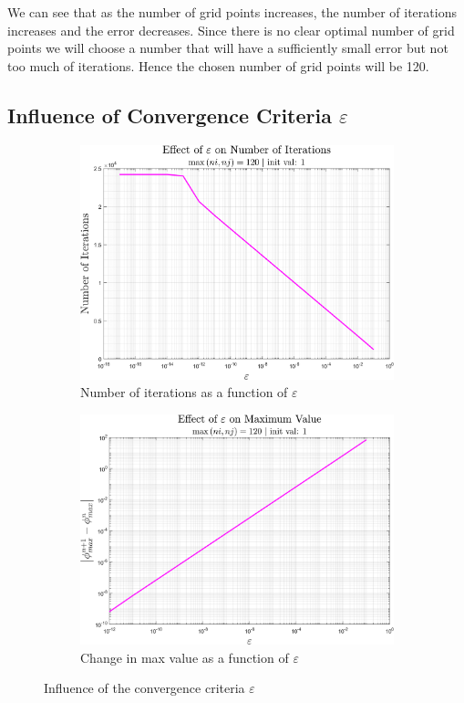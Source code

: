 \documentclass[11pt, a4paper]{article}
\begin{document}
We can see that as the number of grid points increases, the number of iterations increases and the error decreases. Since there is no clear optimal number of grid points we will choose a number that will have a sufficiently small error but not too much of iterations. Hence the chosen number of grid points will be 120.
\subsection{Influence of Convergence Criteria $\varepsilon$}
\begin{figure}[H]
    \centering
    \begin{subfigure}[c]{0.49\textwidth}
        \centering
        \includegraphics[width=\textwidth]{images/epsilon - n.png}
        \caption{Number of iterations as a function of $\varepsilon$}
        \label{fig: n as a function of epsilon}
    \end{subfigure}
    \hfill
    \begin{subfigure}[c]{0.49\textwidth}
        \centering
        \includegraphics[width=\textwidth]{images/epsilon - max diff.png}
        \caption{Change in max value as a function of $\varepsilon$}
        \label{fig: change in max value as a function of epsilon}
    \end{subfigure}
    \caption{Influence of the convergence criteria $\varepsilon$}
    \label{fig: Influence of epsilon}
\end{figure}
\end{document}

